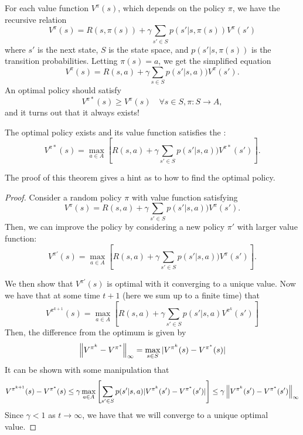 \documentclass[11pt]{scrartcl}
\begin{document}
For each value function $V^\pi (s)$, which depends on the policy $\pi$, we have the recursive relation
\begin{equation*}
    V^{\pi}(s) = R(s, \pi(s)) + \gamma \sum_{s' \in S}p(s' | s, \pi(s))V^{\pi}(s')
\end{equation*}
where $s'$ is the next state, $S$ is the state space, and $p(s' | s, \pi(s))$ is the transition probabilities. Letting $\pi(s) = a$, we get the simplified equation
\begin{equation*}
    V^{\pi}(s) = R(s, a) + \gamma \sum_{s \in S}p(s' | s, a))V^{\pi}(s').
\end{equation*}
An optimal policy should satisfy 
\begin{equation*}
    V^{\pi*}(s) \ge V^{\pi}(s) \quad \forall s \in S, \pi: S \to A,
\end{equation*}
and it turns out that it always exists!
\begin{thm}
The optimal policy exists and its value function satisfies the :
\begin{equation*}
    V^{\pi*}(s) = \max_{a \in A}\left[R(s, a) + \gamma \sum_{s' \in S}p(s' | s, a))V^{\pi*}(s')\right].
\end{equation*}
\end{thm}
The proof of this theorem gives a hint as to how to find the optimal policy.
\begin{proof}
Consider a random policy $\pi$ with value function satisfying 
\begin{equation*}
    V^{\pi}(s) = R(s, a) + \gamma \sum_{s' \in S}p(s' | s, a))V^{\pi}(s').
\end{equation*}
Then, we can improve the policy by considering a new policy $\pi'$ with larger value function:
\begin{equation*}
    V^{\pi'}(s) = \max_{a \in A}\left[R(s, a) + \gamma \sum_{s' \in S}p(s' | s, a))V^{\pi}(s')\right].
\end{equation*}

We then show that $V^{\pi'}(s)$ is optimal with it converging to a unique value. Now we have that at some time $t+1$ (here we sum up to a finite time) that $$V^{\pi^{k+1}}(s)=\max_{a \in A}\left[R(s,a)+\gamma\sum_{s' \in S}p(s'|s,a)V^{\pi^k}(s')\right]$$
Then, the difference from the optimum is given by $$\left\lVert V^{\pi^k}-V^{\pi^*}\right\rVert_\infty=\max_{s \in S}|V^{\pi^k}(s)-V^{\pi^*}(s)|$$
It can be shown with some manipulation that 
$$V^{\pi^{k+1}}(s)-V^{\pi^*}(s) \le \gamma\max_{a \in A}\left[\sum_{s' \in S}p(s'|s,a)|V^{\pi^k}(s')-V^{\pi^*}(s')|\right] \le \gamma\left\lVert V^{\pi^k}(s')-V^{\pi^*}(s')\right\rVert_\infty$$
Since $\gamma<1$ as $t \to \infty$, we have that we will converge to a unique optimal value.
\end{proof}
\end{document}
